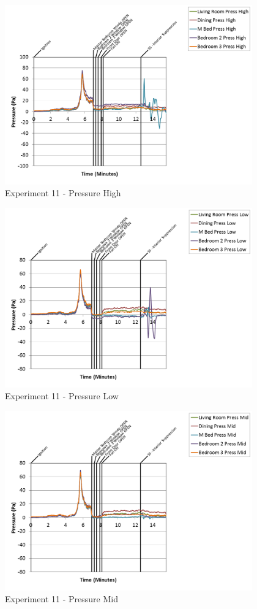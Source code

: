 \documentclass{article}
\begin{document}
\begin{appendices}
\clearpage

\begin{figure}[h!]
	\centering
	\includegraphics[height=3.05in]{0_Images/Results_Charts/Exp_11_Charts/PressureHigh.png}
	\caption{Experiment 11 - Pressure High}
\end{figure}


\begin{figure}[h!]
	\centering
	\includegraphics[height=3.05in]{0_Images/Results_Charts/Exp_11_Charts/PressureLow.png}
	\caption{Experiment 11 - Pressure Low}
\end{figure}

\clearpage

\begin{figure}[h!]
	\centering
	\includegraphics[height=3.05in]{0_Images/Results_Charts/Exp_11_Charts/PressureMid.png}
	\caption{Experiment 11 - Pressure Mid}
\end{figure}



\end{appendices}
\end{document}

